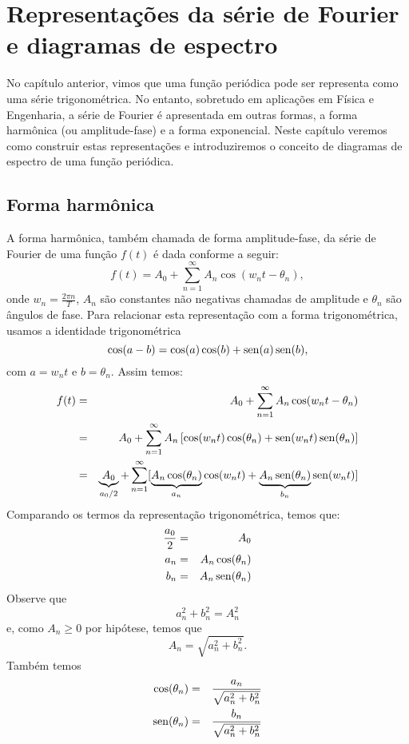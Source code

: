 %
\chapter{Representações da série de Fourier e diagramas de espectro}

No capítulo anterior, vimos que uma função periódica pode ser representa como uma série trigonométrica. No entanto, sobretudo em aplicações em Física e Engenharia, a série de Fourier é apresentada em outras formas, a forma harmônica (ou amplitude-fase) e a forma exponencial. Neste capítulo veremos como construir estas representações e introduziremos o conceito de diagramas de espectro de uma função periódica.

\section{Forma harmônica}
A forma harmônica, também chamada de forma amplitude-fase, da série de Fourier de uma função $f(t)$ é dada conforme a seguir:
$$
f(t)=A_0+\sum_{n=1}^\infty A_n\cos(w_n t-\theta_n),
$$
onde $w_n=\frac{2\pi n}{T}$, $A_n$ são constantes não negativas chamadas de amplitude e $\theta_n$ são ângulos de fase. Para relacionar esta representação com a forma trigonométrica, usamos a identidade trigonométrica
$$
\cos(a-b)=\cos(a)\cos(b)+\operatorname{sen}(a)\operatorname{sen}(b),
$$
com $a=w_n t$ e $b=\theta_n$. Assim temos:
\begin{eqnarray*}
f(t)&=&A_0+\sum_{n=1}^\infty A_n\cos(w_n t-\theta_n)\\
&=&A_0+\sum_{n=1}^\infty A_n\left[\cos(w_n t)\cos(\theta_n)+\operatorname{sen}(w_n t)\operatorname{sen}(\theta_n)\right]\\
&=&\underbrace{A_0}_{a_0/2}+\sum_{n=1}^\infty[ \underbrace{A_n\cos(\theta_n)}_{a_n} \cos(w_n t)+\underbrace{A_n\operatorname{sen}(\theta_n)}_{b_n}\operatorname{sen}(w_n t)]
\end{eqnarray*}
Comparando os termos da representação trigonométrica, temos que:
\begin{eqnarray*}
\frac{a_0}{2}&=&A_0\\
a_n&=&A_n\cos(\theta_n)\\
b_n&=&A_n\operatorname{sen}(\theta_n)\\
\end{eqnarray*}
Observe que
$$
a_n^2+b_n^2=A_n^2
$$
e, como $A_n\geq 0$ por hipótese, temos que 
$$
A_n=\sqrt{a_n^2+b_n^2}.
$$
Também temos
\begin{eqnarray*}
\cos(\theta_n)&=&\frac{a_n}{\sqrt{a_n^2+b_n^2}}\\
\operatorname{sen}(\theta_n)&=&\frac{b_n}{\sqrt{a_n^2+b_n^2}}
\end{eqnarray*}

